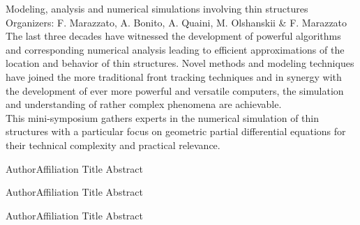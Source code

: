 \label{mini04}

\miniabs
{Modeling, analysis and numerical simulations involving thin structures}
{Organizers: F. Marazzato, A. Bonito, A. Quaini, M. Olshanskii \& F. Marazzato}
{The last three decades have witnessed the development of powerful algorithms and corresponding numerical analysis leading to efficient approximations of the location and behavior of thin structures. Novel methods and modeling techniques have joined the more traditional front tracking techniques and in synergy with the development of ever more powerful and versatile computers, the simulation and understanding of rather complex phenomena are achievable.\\
This mini-symposium gathers experts in the numerical simulation of thin structures with a particular focus on geometric partial differential equations for their technical complexity and practical relevance.}
\vspace{2ex}



\abs
{Author}{Affiliation}
{Title}
{Abstract
}

\vspace{1.5ex}

\abs
{Author}{Affiliation}
{Title}
{Abstract
}

\vspace{1.5ex}

\abs
{Author}{Affiliation}
{Title}
{Abstract
}
